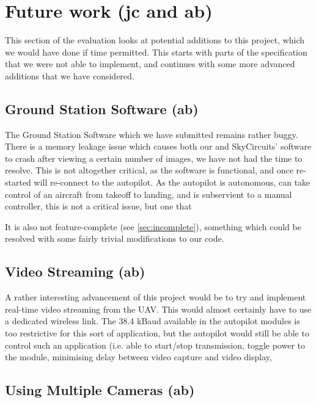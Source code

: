 \section{Future work (jc and ab)}

This section of the evaluation looks at potential additions to this project, 
which we would have done if time permitted. This starts with parts of the 
specification that we were not able to implement, and continues with some 
more advanced additions that we have considered.

\subsection{Ground Station Software (ab)}

The Ground Station Software which we have submitted remains rather buggy. 
There is a memory leakage issue which causes both our and SkyCircuits' 
software to crash after viewing a certain number of images, we have not had the time to resolve. This is not altogether critical, as the software 
is functional, and once re-started will re-connect to the autopilot. 
As the autopilot is autonomous, can take control of an aircraft from takeoff 
to landing, and is subservient to a manual controller, this is not a critical 
issue, but one that 

It is also not feature-complete (see \ref{sec:incomplete}), something which 
could be resolved with some fairly trivial modifications to our code.



\subsection{Video Streaming (ab)}

A rather interesting advancement of this project would be to try and implement 
real-time video streaming from the UAV. This would almost certainly have to use 
a dedicated wireless link. The 38.4 kBaud available in the autopilot modules 
is too restrictive for this sort of application, but the autopilot would still 
be able to control such an application (i.e. able to start/stop transmission, 
toggle power to the module, minimising delay between video capture and video 
display, 

\subsection{Using Multiple Cameras (ab)}

